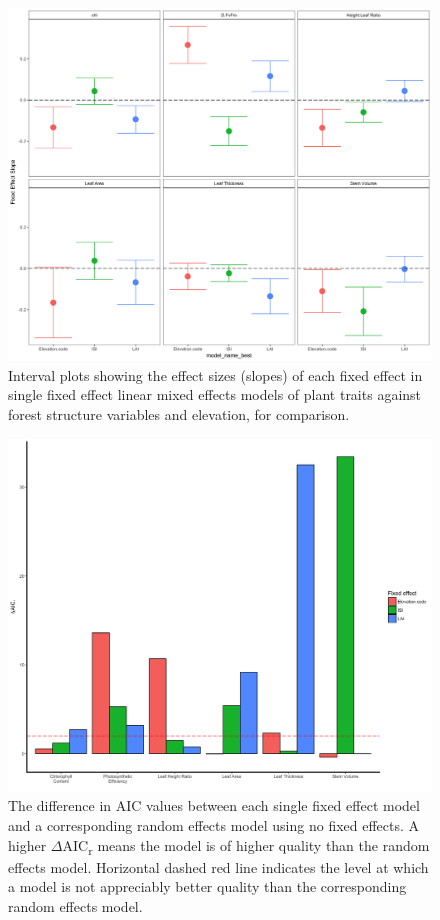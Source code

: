 \documentclass[a4paper,11pt]{article}
\begin{document}
\begin{figure}[H]
\includegraphics[width=\textwidth]{single_trait_eff_size_lmer_ggplot}
\centering
\caption{Interval plots showing the effect sizes (slopes) of each fixed effect in single fixed effect linear mixed effects models of plant traits against forest structure variables and elevation, for comparison.}
\label{fig:single_trait_eff_size_lmer_ggplot}
\end{figure}

\begin{figure}[H]
\includegraphics[width=\textwidth]{daicplot_ggplot}
\centering
\caption{The difference in AIC values between each single fixed effect model and a corresponding random effects model using no fixed effects. A higher $\Delta$AIC\textsubscript{r} means the model is of higher quality than the random effects model. Horizontal dashed red line indicates the level at which a model is not appreciably better quality than the corresponding random effects model.}
\label{fig:daicplot_ggplot}
\end{figure}
\end{document}
